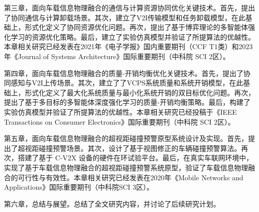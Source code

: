 第三章，面向车载信息物理融合的通信与计算资源协同优化关键技术。首先，提出了协同通信与计算卸载场景。其次，建立了V2I传输模型和任务卸载模型，在此基础上，形式化定义了协同资源优化问题。再次，提出了基于博弈理论的多智能体强化学习的资源优化策略。最后，建立了实验仿真模型并验证了所提算法的优越性。本章相关研究已经发表在2021年《电子学报》国内重要期刊（CCF T1类）和2023年《Journal of Systems Architecture》国际重要期刊（中科院 SCI 2区）。

第四章，面向车载信息物理融合的质量-开销均衡优化关键技术。首先，提出了协同感知与V2I上传场景。其次，建立了了VCPS系统质量和系统开销模型，在此基础上，形式化定义了最大化系统质量与最小化系统开销的双目标优化问题。再次，提出了基于多目标的多智能体深度强化学习的质量-开销均衡策略。最后，构建了实验仿真模型并验证了所提算法的优越性。本章相关研究已经投稿于《IEEE Transactions on Consumer Electronics》国际重要期刊（中科院 SCI 2区）。

第五章，面向车载信息物理融合的超视距碰撞预警原型系统设计及实现。首先，提出了超视距碰撞预警场景。其次，设计了基于视图修正的车辆碰撞预警算法。再次，搭建了基于 C-V2X 设备的硬件在环试验平台。最后，在真实车联网环境中，实现了基于车载信息物理融合的超视距碰撞预警系统原型，验证了车载信息物理融合的可行性与有效性。本章相关研究已经发表在2020年《Mobile Networks and Applications》国际重要期刊（中科院SCI 3区）。

第六章，总结与展望。总结了全文研究内容，并讨论了后续研究计划。






